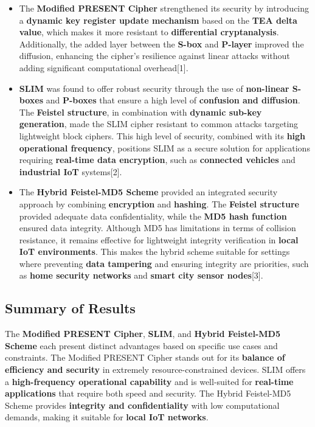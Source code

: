 \documentclass{article}
\begin{document}
\begin{itemize}
    \item The \textbf{Modified PRESENT Cipher} strengthened its security by introducing a \textbf{dynamic key register update mechanism} based on the \textbf{TEA delta value}, which makes it more resistant to \textbf{differential cryptanalysis}. Additionally, the added layer between the \textbf{S-box} and \textbf{P-layer} improved the diffusion, enhancing the cipher's resilience against linear attacks without adding significant computational overhead[1].
    \item \textbf{SLIM} was found to offer robust security through the use of \textbf{non-linear S-boxes} and \textbf{P-boxes} that ensure a high level of \textbf{confusion and diffusion}. The \textbf{Feistel structure}, in combination with \textbf{dynamic sub-key generation}, made the SLIM cipher resistant to common attacks targeting lightweight block ciphers. This high level of security, combined with its \textbf{high operational frequency}, positions SLIM as a secure solution for applications requiring \textbf{real-time data encryption}, such as \textbf{connected vehicles} and \textbf{industrial IoT} systems[2].
    \item The \textbf{Hybrid Feistel-MD5 Scheme} provided an integrated security approach by combining \textbf{encryption} and \textbf{hashing}. The \textbf{Feistel structure} provided adequate data confidentiality, while the \textbf{MD5 hash function} ensured data integrity. Although MD5 has limitations in terms of collision resistance, it remains effective for lightweight integrity verification in \textbf{local IoT environments}. This makes the hybrid scheme suitable for settings where preventing \textbf{data tampering} and ensuring integrity are priorities, such as \textbf{home security networks} and \textbf{smart city sensor nodes}[3].
\end{itemize}

\subsection{Summary of Results}

The \textbf{Modified PRESENT Cipher}, \textbf{SLIM}, and \textbf{Hybrid Feistel-MD5 Scheme} each present distinct advantages based on specific use cases and constraints. The Modified PRESENT Cipher stands out for its \textbf{balance of efficiency and security} in extremely resource-constrained devices. SLIM offers a \textbf{high-frequency operational capability} and is well-suited for \textbf{real-time applications} that require both speed and security. The Hybrid Feistel-MD5 Scheme provides \textbf{integrity and confidentiality} with low computational demands, making it suitable for \textbf{local IoT networks}.
\end{document}
